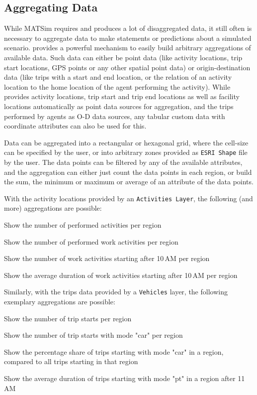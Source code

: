 \subsection{Aggregating Data}
While MATSim requires and produces a lot of disaggregated data, it still often
is necessary to aggregate data to make statements or predictions about a
simulated scenario. \Via{} provides a powerful mechanism to easily build
arbitrary aggregations of available data. Such data can either be point data
(like activity locations, trip start locations, GPS points or any other spatial
point data) or origin-destination data (like trips with a start and end
location, or the relation of an activity location to the home location of the
agent performing the activity). While \Via{} provides activity locations, trip
start and trip end locations as well as facility locations automatically as point data
sources for aggregation, and the trips performed by agents as O-D data sources,
any tabular custom data with coordinate attributes can also be used for this. 

Data can be aggregated into a rectangular or hexagonal grid, where the cell-size
can be specified by the user, or into arbitrary zones provided as \lstinline|ESRI Shape| file by the user. The data points can be filtered by any of the
available attributes, and the aggregation can either just count the data points
in each region, or build the sum, the minimum or maximum or average of an
attribute of the data points.

With the activity locations provided by an
\lstinline|Activities Layer|, the following (and more) aggregations are possible:
\begin{compactitem}
  \item Show the number of performed activities per region
  \item Show the number of performed work activities per region
  \item Show the number of work activities starting after 10\,AM per region
  \item Show the average duration of work activities starting after 10\,AM per
  region
\end{compactitem}
Similarly, with the trips data provided by a \lstinline|Vehicles| layer, the following
exemplary aggregations are possible:
\begin{compactitem}
  \item Show the number of trip starts per region
  \item Show the number of trip starts with mode "car" per region
  \item Show the percentage share of trips starting with mode "car" in a
  region, compared to all trips starting in that region
  \item Show the average duration of trips starting with mode "pt" in a region
  after 11\,AM
\end{compactitem}

